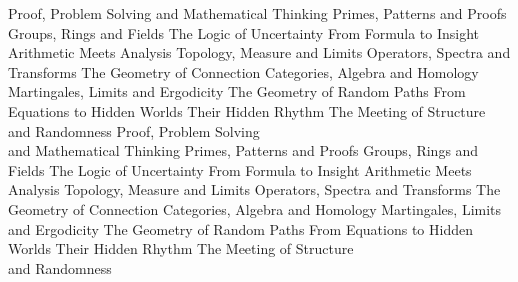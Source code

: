 \newcommand{\volumesubtitledef}[2]{\expandafter\def\csname ocsubtitle@#1\endcsname{#2}}
\newcommand{\volumesubtitle}[1]{\ifcsname ocsubtitle@#1\endcsname\csname ocsubtitle@#1\endcsname\fi}
\volumesubtitledef{1}{Proof, Problem Solving and Mathematical Thinking}
\volumesubtitledef{2}{Primes, Patterns and Proofs}
\volumesubtitledef{3}{Groups, Rings and Fields}
\volumesubtitledef{4}{The Logic of Uncertainty}
\volumesubtitledef{5}{From Formula to Insight}
\volumesubtitledef{6}{Arithmetic Meets Analysis}
\volumesubtitledef{7}{Topology, Measure and Limits}
\volumesubtitledef{8}{Operators, Spectra and Transforms}
\volumesubtitledef{9}{The Geometry of Connection}
\volumesubtitledef{10}{Categories, Algebra and Homology}
\volumesubtitledef{11}{Martingales, Limits and Ergodicity}
\volumesubtitledef{12}{The Geometry of Random Paths}
\volumesubtitledef{13}{From Equations to Hidden Worlds}
\volumesubtitledef{14}{Their Hidden Rhythm}
\volumesubtitledef{15}{The Meeting of Structure and Randomness}
\providecommand{\seriessubtitle}{}
\renewcommand{\seriessubtitle}{The Hidden Architecture of Mathematics}
\newcommand{\volumecoversubtitle}[1]{\csname occoversubtitle@#1\endcsname}
\expandafter\def\csname occoversubtitle@1\endcsname{Proof, Problem Solving\\and Mathematical Thinking}
\expandafter\def\csname occoversubtitle@2\endcsname{Primes, Patterns and Proofs}
\expandafter\def\csname occoversubtitle@3\endcsname{Groups, Rings and Fields}
\expandafter\def\csname occoversubtitle@4\endcsname{The Logic of Uncertainty}
\expandafter\def\csname occoversubtitle@5\endcsname{From Formula to Insight}
\expandafter\def\csname occoversubtitle@6\endcsname{Arithmetic Meets Analysis}
\expandafter\def\csname occoversubtitle@7\endcsname{Topology, Measure and Limits}
\expandafter\def\csname occoversubtitle@8\endcsname{Operators, Spectra and Transforms}
\expandafter\def\csname occoversubtitle@9\endcsname{The Geometry of Connection}
\expandafter\def\csname occoversubtitle@10\endcsname{Categories, Algebra and Homology}
\expandafter\def\csname occoversubtitle@11\endcsname{Martingales, Limits and Ergodicity}
\expandafter\def\csname occoversubtitle@12\endcsname{The Geometry of Random Paths}
\expandafter\def\csname occoversubtitle@13\endcsname{From Equations to Hidden Worlds}
\expandafter\def\csname occoversubtitle@14\endcsname{Their Hidden Rhythm}
\expandafter\def\csname occoversubtitle@15\endcsname{The Meeting of Structure\\and Randomness}

